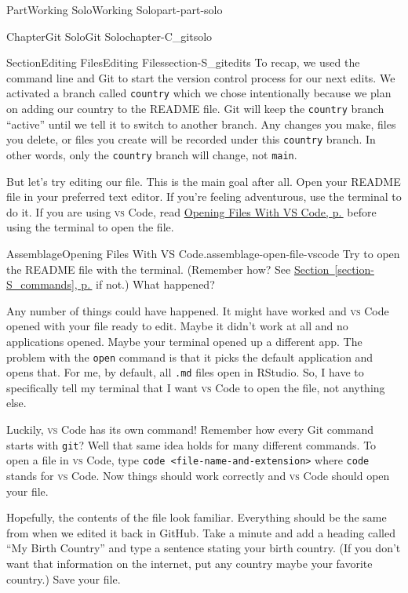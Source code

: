 \documentclass[twoside,10pt,]{book}
\newcommand{\xreffont}{\relax}
\newcommand{\mono}[1]{\texttt{#1}}
\newcommand{\initialism}[1]{\textsc{\MakeLowercase{#1}}}
\DeclareRobustCommand{\initialismintitle}[1]{\texorpdfstring{#1}{#1}}
\begin{document}
\begin{partptx}{Part}{Working Solo}{}{Working Solo}{}{}{part-part-solo}
\begin{chapterptx}{Chapter}{Git Solo}{}{Git Solo}{}{}{chapter-C_gitsolo}
\begin{sectionptx}{Section}{Editing Files}{}{Editing Files}{}{}{section-S_gitedits}
To recap, we used the command line and Git to start the version control process for our next edits. We activated a branch called \mono{country} which we chose intentionally because we plan on adding our country to the README file. Git will keep the \mono{country} branch ``active'' until we tell it to switch to another branch. Any changes you make, files you delete, or files you create will be recorded under this \mono{country} branch. In other words, only the \mono{country} branch will change, not \mono{main}.%
\par
But let's try editing our file. This is the main goal after all. Open your README file in your preferred text editor. If you're feeling adventurous, use the terminal to do it. If you are using \initialism{VS} Code, read \hyperref[assemblage-open-file-vscode]{Opening Files With \initialismintitle{VS} Code, p.\,\pageref{assemblage-open-file-vscode}} before using the terminal to open the file.%
\begin{assemblage}{Assemblage}{Opening Files With \initialismintitle{VS} Code.}{assemblage-open-file-vscode}%
Try to open the README file with the terminal. (Remember how? See \hyperref[section-S_commands]{Section~{\xreffont\ref{section-S_commands}}, p.\,\pageref{section-S_commands}} if not.) What happened?%
\par
Any number of things could have happened. It might have worked and \initialism{VS} Code opened with your file ready to edit. Maybe it didn't work at all and no applications opened. Maybe your terminal opened up a different app. The problem with the \mono{open} command is that it picks the default application and opens that. For me, by default, all \mono{.md} files open in RStudio. So, I have to specifically tell my terminal that I want \initialism{VS} Code to open the file, not anything else.%
\par
Luckily, \initialism{VS} Code has its own command! Remember how every Git command starts with \mono{git}? Well that same idea holds for many different commands. To open a file in \initialism{VS} Code, type \mono{code <file-name-and-extension>} where \mono{code} stands for \initialism{VS} Code. Now things should work correctly and \initialism{VS} Code should open your file.%
\end{assemblage}
Hopefully, the contents of the file look familiar. Everything should be the same from when we edited it back in GitHub. Take a minute and add a heading called ``My Birth Country'' and type a sentence stating your birth country. (If you don't want that information on the internet, put any country \textellipsis{} maybe your favorite country.) Save your file.%

\end{sectionptx}
\end{chapterptx}
\end{partptx}
\end{document}
